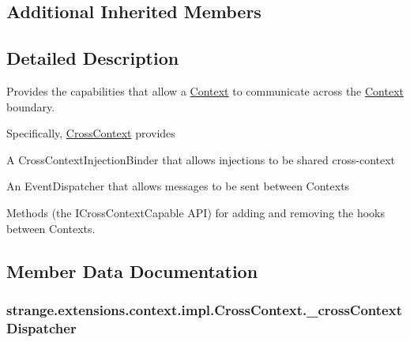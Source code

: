 \subsection*{Additional Inherited Members}


\subsection{Detailed Description}
Provides the capabilities that allow a \hyperlink{classstrange_1_1extensions_1_1context_1_1impl_1_1_context}{Context} to communicate across the \hyperlink{classstrange_1_1extensions_1_1context_1_1impl_1_1_context}{Context} boundary. 

Specifically, \hyperlink{classstrange_1_1extensions_1_1context_1_1impl_1_1_cross_context}{Cross\-Context} provides
\begin{DoxyItemize}
\item A Cross\-Context\-Injection\-Binder that allows injections to be shared cross-\/context
\item An Event\-Dispatcher that allows messages to be sent between Contexts
\item Methods (the I\-Cross\-Context\-Capable A\-P\-I) for adding and removing the hooks between Contexts. 
\end{DoxyItemize}

\subsection{Member Data Documentation}
\hypertarget{classstrange_1_1extensions_1_1context_1_1impl_1_1_cross_context_a00c68512ad80d15236954614f223820e}{
\subsubsection[{\-\_\-cross\-Context\-Dispatcher}]{ strange.\-extensions.\-context.\-impl.\-Cross\-Context.\-\_\-cross\-Context\-Dispatcher\hspace{0.3cm}{\ttfamily [protected]}}}\label{classstrange_1_1extensions_1_1context_1_1impl_1_1_cross_context_a00c68512ad80d15236954614f223820e}



